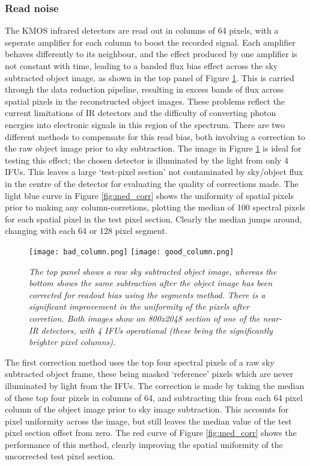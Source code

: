\documentclass{literature}
\begin{document}
\subsubsection{Read noise}\label{subsubsec:read_noise}

The KMOS infrared detectors are read out in columns of 64 pixels, with a seperate amplifier for each column to boost the recorded signal. Each amplifier behaves differently to its neighbour, and the effect produced by one amplifier is not constant with time, leading to a banded flux bias effect across the sky subtracted object image, as shown in the top panel of Figure \ref{fig:column_sub}. This is carried through the data reduction pipeline, resulting in excess bands of flux across spatial pixels in the reconstructed object images. These problems reflect the current limitations of IR detectors and the difficulty of converting photon energies into electronic signals in this region of the spectrum. There are two different methods to compensate for this read bias, both involving a correction to the raw object image prior to sky subtraction. The image in Figure \ref{fig:column_sub} is ideal for testing this effect; the chosen detector is illuminated by the light from only 4 IFUs. This leaves a large `test-pixel section' not contaminated by sky/object flux in the centre of the detector for evaluating the quality of corrections made. The light blue curve in Figure \ref{fig:med_corr} shows the uniformity of spatial pixels prior to making any column-corretions, plotting the median of 100 spectral pixels for each spatial pixel in the test pixel section. Clearly the median jumps around, changing with each 64 or 128 pixel segment. \\ 

\begin{figure}[!htp]
\centering
\texttt{[image: bad\_column.png]}
\texttt{[image: good\_column.png]}
\caption{\footnotesize{\emph{The top panel shows a raw sky subtracted object image, whereas the bottom shows the same subtraction after the object image has been corrected for readout bias using the segments method. There is a significant improvement in the uniformity of the pixels after corretion. Both images show an 800x2048 section of one of the near-IR detectors, with 4 IFUs operational (these being the significantly brighter pixel columns).}}}
\label{fig:column_sub}
\end{figure}

The first correction method uses the top four spectral pixels of a raw sky subtracted object frame, these being masked `reference' pixels which are never illuminated by light from the IFUs. The correction is made by taking the median of these top four pixels in columns of 64, and subtracting this from each 64 pixel column of the object image prior to sky image subtraction. This accounts for pixel uniformity across the image, but still leaves the median value of the test pixel section offset from zero. The red curve of Figure \ref{fig:med_corr} shows the performance of this method, clearly improving the spatial uniformity of the uncorrected test pixel section.  \\ 
\end{document}
